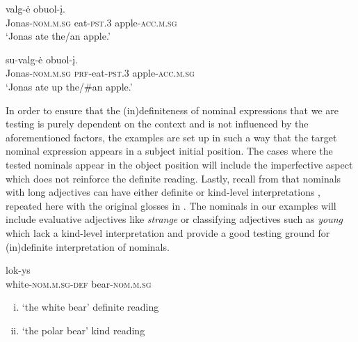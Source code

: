 \documentclass[output=paper,
modfonts
]{langscibook}
\begin{document}
\begin{exe}
\ex \label{ex:sereikaite:30}
\begin{xlist}
	\ex \label{ex:sereikaite:30a}
	 {valg-ė} {obuol-į}.\\
	Jonas-\textsc{nom.m.sg} eat-\textsc{pst.3} apple-\textsc{acc.m.sg}\\
	\trans `Jonas ate the/an apple.' \citep[75]{GillonArmoskaite2015}
	
	\ex \label{ex:sereikaite:30b}
	 {su-valg-ė} {obuol-į}.\\
	Jonas-\textsc{nom.m.sg} \textsc{prf}-eat-\textsc{pst.3} apple-\textsc{acc.m.sg}\\
	\trans `Jonas ate up the/\#an apple.' \citep[76]{GillonArmoskaite2015}
\end{xlist}
\end{exe}

In order to ensure that the (in)definiteness of nominal expressions that we are testing is purely dependent on the context and is not influenced by the aforementioned factors, the examples are set up in such a way that the target nominal expression appears in a subject initial position. The cases where the tested nominals appear in the object position will include the imperfective aspect which does not reinforce the definite reading.
Lastly, recall from  that nominals with long adjectives can have either definite or kind-level interpretations , repeated here with the original glosses in . The nominals in our examples will include evaluative adjectives like \textit{strange} or classifying adjectives such as \textit{young} which lack a kind-level interpretation and provide a good testing ground for (in)definite interpretation of nominals.


\begin{exe} 
\ex \label{ex:sereikaite:31}
 {lok-ys} \\
white-\textsc{nom.m.sg}-{\textsc{def}} bear-\textsc{nom.m.sg}  \\
\trans 
\begin{enumerate}[(i)]
	\item `the white bear' \checkmark definite reading  
	\item `the polar bear' \checkmark kind reading  
\end{enumerate}
\end{exe}
\end{document}
